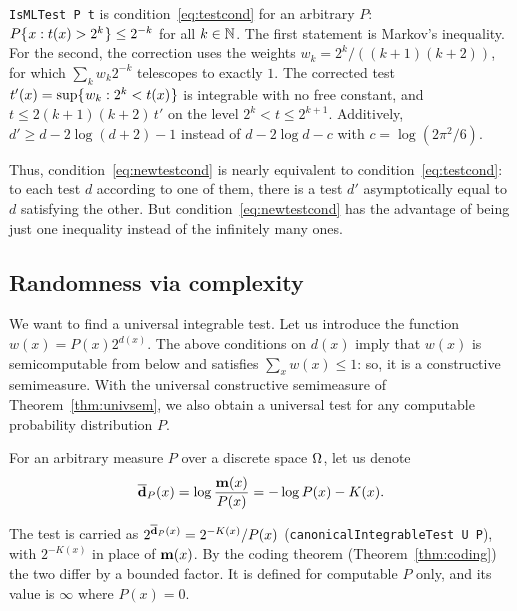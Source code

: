 \begin{formalization}
\texttt{IsMLTest P t} is condition~\eqref{eq:testcond} for an arbitrary \( P \):
\( P\mathopen\{\mskip 1mu x : t(x) > 2^{k}\mskip 1mu\mathclose\} \le 2^{-k} \) for all \( k \in \mathbb{N} \). The first statement is
Markov's inequality. For the second, the correction uses the weights
\( w_{k} = 2^{k}/((k+1)(k+2)) \), for which \( \sum_{k} w_{k} 2^{-k} \) telescopes to exactly
\( 1 \). The corrected test \( t'(x) = \sup\mathopen\{\mskip 1mu w_{k} : 2^{k} < t(x)\mskip 1mu\mathclose\} \) is integrable with
no free constant, and \( t \le 2(k+1)(k+2)\, t' \) on the level \( 2^{k} < t \le 2^{k+1} \).
Additively, \( d' \ge d - 2\log(d+2) - 1 \) instead of \( d - 2\log d - c \) with
\( c = \log(2\pi^{2}/6) \).
\end{formalization}

Thus, condition~\ref{eq:newtestcond} is nearly equivalent
to condition~\eqref{eq:testcond}: to each test $d$ according to one of them,
there is a test $d'$ asymptotically equal to $d$ satisfying the other.
But condition~\eqref{eq:newtestcond} has the advantage
of being just one inequality instead of the infinitely many ones.

\subsection{Randomness via complexity}

We want to find a universal integrable test.
Let us introduce the function $w(x) = P(x)2^{d(x)}$.
The above conditions on $d(x)$
imply that $w(x)$ is semicomputable from below
and satisfies $\sum_{x} w(x) \le 1$: so, it is a constructive semimeasure.
With the universal constructive semimeasure of Theorem~\ref{thm:univsem},
we also obtain a universal test for any computable probability distribution $P$.

\begin{definition}
  \label{def:g2.2.4}
  \leanok
For an arbitrary measure $P$ over a discrete space $\Omega$, let us denote
 \begin{equation}\label{eq:d_c}
  \overline{\mathbf{d}}_{P}(x) = \log\frac{\mathbf{m}(x)}{P(x)} = -\log P(x) - K(x).
 \end{equation}
\end{definition}

\begin{formalization}
The test is carried as \( 2^{\overline{\mathbf{d}}_{P}(x)} = 2^{-K(x)}/P(x) \) (\texttt{canonicalIntegrableTest U P}),
with \( 2^{-K(x)} \) in place of \( \mathbf{m}(x) \). By the coding theorem
(Theorem~\ref{thm:coding}) the two differ by a bounded factor. It is defined for computable
\( P \) only, and its value is \( \infty \) where \( P(x) = 0 \).
\end{formalization}

